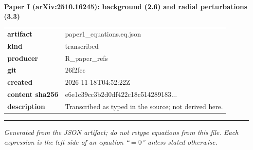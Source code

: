 \documentclass[10pt,a4paper]{article}
\begin{document}
{\Large\bfseries Paper I (arXiv:2510.16245): background (2.6) and radial perturbations (3.3)}\par
\smallskip
\begin{tabular}{@{}lp{}@{}}\textbf{artifact} & paper1\_equations.eq.json\\\textbf{kind} & transcribed\\\textbf{producer} & R\_paper\_refs\\\textbf{git} & 26f2fcc\\\textbf{created} & 2026-11-18T04:52:22Z\\\textbf{content sha256} & e6e1c39cc3b2d0df422c18c514289183...\\\textbf{description} & Transcribed as typed in the source; not derived here.\\\end{tabular}
\par\medskip\hrule\medskip

\textit{Generated from the JSON artifact; do not retype equations from this file. Each expression is the left side of an equation ``$= 0$'' unless stated otherwise.}\par
\end{document}
